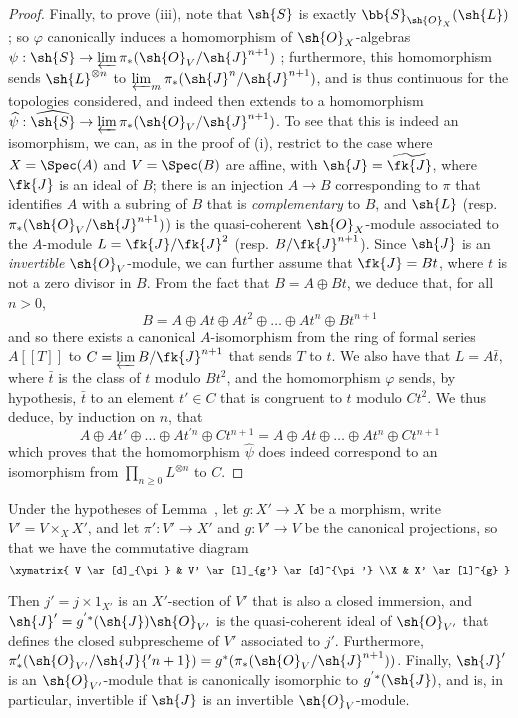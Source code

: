 \begin{proof}
Finally, to prove (iii), note that $\sh{S}$ is exactly $\bb{S}_{\sh{O}_X}(\sh{L})$;
so $\varphi$ canonically induces a homomorphism of $\sh{O}_X$-algebras $\psi:\sh{S}\to\varprojlim\pi_*(\sh{O}_V/\sh{J}^{n+1})$ ;
furthermore, this homomorphism sends $\sh{L}^{\otimes n}$ to $\varprojlim_m\pi_*(\sh{J}^n/\sh{J}^{n+1})$, and is thus continuous for the topologies considered, and indeed then extends to a homomorphism $\widehat{\psi}:\widehat{\sh{S}}\to\varprojlim\pi_*(\sh{O}_V/\sh{J}^{n+1})$.
To see that this is indeed an isomorphism, we can, as in the proof of (i), restrict to the case where $X=\Spec(A)$ and $V=\Spec(B)$ are affine, with $\sh{J}=\widetilde{\fk{J}}$, where $\fk{J}$ is an ideal of $B$;
there is an injection $A\to B$ corresponding to $\pi$ that identifies $A$ with a subring of $B$ that is \emph{complementary} to $B$, and $\sh{L}$ (resp. $\pi_*(\sh{O}_V/\sh{J}^{n+1})$) is the quasi-coherent $\sh{O}_X$-module associated to the $A$-module $L=\fk{J}/\fk{J}^2$ (resp. $B/\fk{J}^{n+1}$).
Since $\sh{J}$ is an \emph{invertible} $\sh{O}_V$-module, we can further assume that $\fk{J}=Bt$, where $t$ is not a zero divisor in $B$.
From the fact that $B=A\oplus Bt$, we deduce that, for all $n>0$,
\[
  B = A \oplus At \oplus At^2 \oplus \ldots \oplus At^n \oplus Bt^{n+1}
\]
and so there exists a canonical $A$-isomorphism from the ring of formal series $A[[T]]$ to $C=\varprojlim B/\fk{J}^{n+1}$ that sends $T$ to $t$.
We also have that $L=A\bar{t}$, where $\bar{t}$ is the class of $t$ modulo $Bt^2$, and the homomorphism $\varphi$ sends, by hypothesis, $\bar{t}$ to an element $t'\in C$ that is congruent to $t$ modulo $Ct^2$.
We thus deduce, by induction on $n$, that
\[
  A \oplus At' \oplus \ldots \oplus At^{'n} \oplus Ct^{n+1}
  =
  A \oplus At \oplus \ldots \oplus At^n \oplus Ct^{n+1}
\]
which proves that the homomorphism $\widehat{\psi}$ does indeed correspond to an isomorphism from $\prod_{n\geq0}L^{\otimes n}$ to $C$.
\end{proof}

\begin{lemma}[8.10.2]
\label{II.8.10.2}
Under the hypotheses of Lemma~, let $g:X'\to X$ be a morphism,
write $V'=V\times_X X'$, and let $\pi':V'\to X'$ and $g:V'\to V$ be the canonical projections, so that we have the commutative diagram
\[
  \xymatrix{
    V
      \ar[d]_{\pi}
  & V'
      \ar[l]_{g'}
      \ar[d]^{\pi'}
  \\X
  & X'
      \ar[l]^{g}
  }
\]

Then $j'=j\times1_{X'}$ is an $X'$-section of $V'$ that is also a closed immersion, and $\sh{J}'=g^{'*}(\sh{J})\sh{O}_{V'}$ is the quasi-coherent ideal of $\sh{O}_{V'}$ that defines the closed subprescheme of $V'$ associated to $j'$.
Furthermore, $\pi'_*(\sh{O}_{V'}/\sh{J}{'n+1}) = g^*(\pi_*(\sh{O}_V/\sh{J}^{n+1}))$.
Finally, $\sh{J}'$ is an $\sh{O}_{V'}$-module that is canonically isomorphic to $g^{'*}(\sh{J})$, and is, in particular, invertible if $\sh{J}$ is an invertible $\sh{O}_V$-module.
\end{lemma}

